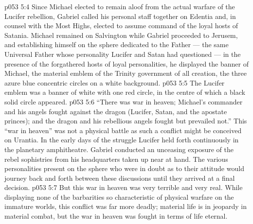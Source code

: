 \vs p053 5:4 \pc Since Michael elected to remain aloof from the actual warfare of the Lucifer rebellion, Gabriel called his personal staff together on Edentia and, in counsel with the Most Highs, elected to assume command of the loyal hosts of Satania. Michael remained on Salvington while Gabriel proceeded to Jerusem, and establishing himself on the sphere dedicated to the Father --- the same Universal Father whose personality Lucifer and Satan had questioned --- in the presence of the forgathered hosts of loyal personalities, he displayed the banner of Michael, the material emblem of the Trinity government of all creation, the three azure blue concentric circles on a white background.
\vs p053 5:5 The Lucifer emblem was a banner of white with one red circle, in the centre of which a black solid circle appeared.
\vs p053 5:6 “There was war in heaven; Michael’s commander and his angels fought against the dragon (Lucifer, Satan, and the apostate princes); and the dragon and his rebellious angels fought but prevailed not.” This “war in heaven” was not a physical battle as such a conflict might be conceived on Urantia. In the early days of the struggle Lucifer held forth continuously in the planetary amphitheatre. Gabriel conducted an unceasing exposure of the rebel sophistries from his headquarters taken up near at hand. The various personalities present on the sphere who were in doubt as to their attitude would journey back and forth between these discussions until they arrived at a final decision.
\vs p053 5:7 But this war in heaven was very terrible and very real. While displaying none of the barbarities so characteristic of physical warfare on the immature worlds, this conflict was far more deadly; material life is in jeopardy in material combat, but the war in heaven was fought in terms of life eternal.
